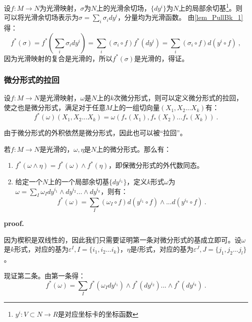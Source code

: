设$f:M\rightarrow N$为光滑映射，$\sigma$为$N$上的光滑余切场，$\{dy^i\}$为$N$上的局部余切基\footnote{$y^i:V\subset N\rightarrow R$是对应坐标卡的坐标函数}。则可以将光滑余切场表示为$\sigma=\sum_i\sigma_idy^i $，分量均为光滑函数。
由\autoref{lem_PullBk_1} 得：
\begin{equation}
f^*(\sigma)=f^*(\sum_i\sigma_idy^i)=\sum_i(\sigma_i\circ f)f^*(dy^i)=\sum_i(\sigma_i\circ f)d(y^i\circ f)~,
\end{equation}
因为光滑映射的复合是光滑的，所以$f^*(\sigma)$是光滑的，得证。
\subsubsection{微分形式的拉回}
\begin{definition}{}
设$f:M\rightarrow N$是光滑映射，$\omega$是$N$上的$k$次微分形式，则可以定义微分形式的拉回，使之也是微分形式，满足对于任意$M$上的一组切向量$(X_1,X_2...X_k)$有：
\begin{equation}
f^*(\omega)(X_1,X_2...X_k)=\omega(f_*(X_1),f_*(X_2)...f_*(X_k))~.
\end{equation}
\end{definition}
由于微分形式的外积依然是微分形式，因此也可以被“拉回”。
\begin{theorem}{}
若$f:M\rightarrow N$是光滑的，$\omega,\eta$是$N$上的微分形式。那么有：
\begin{enumerate}
\item $f^*(\omega\wedge \eta)=f^*(\omega)\wedge f^*(\eta)$，即保微分形式的外代数同态。
\item 给定一个$N$上的一个局部余切基$\{dy^{i_1}\}$，定义$k$形式$\omega$为$\omega=\sum_I\omega_I dy^{i_1}\wedge dy^{i_2}...\wedge dy^{i_k}$，则有：
\begin{equation}
f^*(\omega)=\sum_I (\omega_I\circ f)d(y^{i_1}\circ f)\wedge...d(y^{i_k}\circ f)~.
\end{equation}
\end{enumerate}


\end{theorem}
\textbf{proof.}

因为楔积是双线性的，因此我们只需要证明第一条对微分形式的基成立即可。设$\omega$是$k$形式，对应的基为$\varepsilon^I,I=\{i_1,i_2...i_k\}$，$\eta$是$l$形式，对应的基为$\varepsilon^J,J=\{j_1,j_2...j_l\}$。

现证第二条。由第一条得：
\begin{equation}
f^*(\omega)=\sum_If^*(\omega_I dy^{i_1} )\wedge f^*(dy^{i_2})...\wedge f^*(dy^{i_k})~.
\end{equation}

